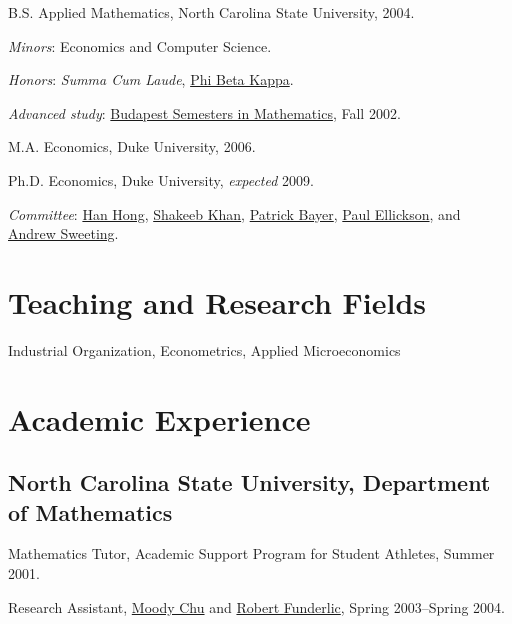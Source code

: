 \documentclass[letterpaper]{article}
\renewenvironment{itemize}{
  \begin{list}{}{
    \setlength{\leftmargin}{1em}
  }
}{
  \end{list}
}
\begin{document}
\begin{itemize}
  \item B.S. Applied Mathematics, North Carolina State University, 2004.
    \begin{itemize}
    \item \textit{Minors}: Economics and Computer Science.
    \item \textit{Honors}: \textit{Summa Cum Laude},
      \href{http://www.pbk.org/}{Phi Beta Kappa}.
    \item \textit{Advanced study}:
      \href{http://www.stolaf.edu/depts/math-old/budapest/}{Budapest
        Semesters in Mathematics}, Fall 2002.
    \end{itemize}

  \item M.A. Economics, Duke University, 2006.

  \item Ph.D. Economics, Duke University, \textit{expected} 2009.
    \begin{itemize}
    \item \textit{Committee}:
      \href{http://www.stanford.edu/~doubleh/}{Han Hong},
      \href{http://www.econ.duke.edu/~shakeebk/}{Shakeeb Khan},
      \href{http://www.econ.duke.edu/~pb29/}{Patrick Bayer},
      \href{http://www.econ.duke.edu/~paule/}{Paul Ellickson}, and
      \href{http://www.econ.duke.edu/~atsweet/}{Andrew Sweeting}.
    \end{itemize}
\end{itemize}


\section*{Teaching and Research Fields}

Industrial Organization, Econometrics, Applied Microeconomics


\section*{Academic Experience}

\subsection*{North Carolina State University,
  Department of Mathematics}

\begin{itemize}
\item Mathematics Tutor, Academic Support Program for Student Athletes,
  Summer 2001.
\item Research Assistant,
  \href{http://www4.ncsu.edu/~mtchu/}{Moody Chu} and
  \href{http://www4.ncsu.edu/~ref/}{Robert Funderlic},
  Spring 2003--Spring 2004.
\end{itemize}
\end{document}
